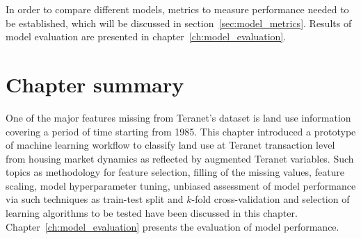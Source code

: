 In order to compare different models, metrics to measure performance needed to be established, which will be discussed in section~\ref{sec:model_metrics}.
Results of model evaluation are presented in chapter~\ref{ch:model_evaluation}.

\section{Chapter summary} \label{sec:ml_workflow_summary}

One of the major features missing from Teranet's dataset is land use information covering a period of time starting from 1985.
This chapter introduced a prototype of machine learning workflow to classify land use at Teranet transaction level from housing market dynamics as reflected by augmented Teranet variables.
Such topics as methodology for feature selection, filling of the missing values, feature scaling, model hyperparameter tuning, unbiased assessment of model performance via such techniques as train-test split and $k$-fold cross-validation and selection of learning algorithms to be tested have been discussed in this chapter.
Chapter~\ref{ch:model_evaluation} presents the evaluation of model performance.